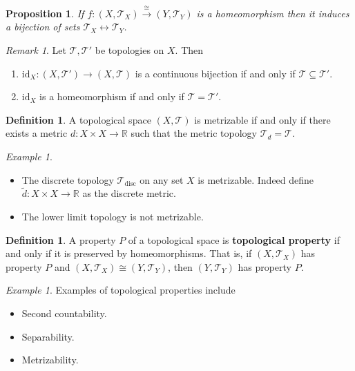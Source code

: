 \documentclass[ 12pt ]{article}
\theoremstyle{plain}
\theoremstyle{plain}
\newtheorem{proposition}[theorem]{Proposition}
\theoremstyle{definition}
\newtheorem{definition}[theorem]{Definition}
\theoremstyle{remark}
\newtheorem{remark}[theorem]{Remark}
\newtheorem{example}[theorem]{Example}
\begin{document}
\begin{proposition}
	If $f : (X, \mathcal{T}_X) \overset{\cong}{\to} (Y, \mathcal{T}_Y)$ is a homeomorphism then it induces a bijection of sets $\mathcal{T}_X \leftrightarrow \mathcal{T}_Y$.
\end{proposition}

\begin{remark}
	Let $\mathcal{T}, \mathcal{T}'$ be topologies on $X$. Then
	\begin{enumerate}
		\item $\mathrm{id}_X : (X, \mathcal{T}') \to (X, \mathcal{T})$ is a continuous bijection if and only if $\mathcal{T} \subseteq \mathcal{T}'$.
		\item $\mathrm{id}_X$ is a homeomorphism if and only if $\mathcal{T} = \mathcal{T}'$.
	\end{enumerate}
\end{remark}

\begin{definition}
	A topological space $(X, \mathcal{T})$ is metrizable if and only if there exists a metric $d : X \times X \to \mathbb{R}$ such that the metric topology $\mathcal{T}_d = \mathcal{T}$.
\end{definition}

\begin{example} $ $
	\begin{itemize}
		\item The discrete topology $\mathcal{T}_\mathrm{disc}$ on any set $X$ is metrizable. Indeed define $\widetilde{d} : X \times X \to \mathbb{R}$ as the discrete metric.
		\item The lower limit topology is not metrizable.
	\end{itemize}
\end{example}

\begin{definition}
	A property $P$ of a topological space is \textbf{topological property} if and only if it is preserved by homeomorphisms. That is, if $(X, \mathcal{T}_X)$ has property $P$ and $(X,
	\mathcal{T}_X) \cong (Y, \mathcal{T}_Y)$, then $(Y, \mathcal{T}_Y)$ has property $P$.
\end{definition}

\begin{example}
	Examples of topological properties include
	\begin{itemize}
		\item Second countability.
		\item Separability.
		\item Metrizability.
	\end{itemize}
\end{example}
\end{document}
